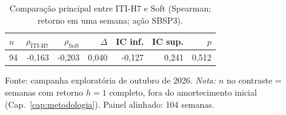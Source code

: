 \begin{table}[htbp]
\centering
\caption{Comparação principal entre ITI-H7 e Soft (Spearman; retorno em uma semana; ação SBSP3).}
\label{tab:iti-primary}
\begin{tabularx}{\textwidth}{@{}lrrrrrr@{}}
\toprule
$n$ & $\rho_{\mathrm{ITI\text{-}H7}}$ & $\rho_{\mathrm{Soft}}$ & $\Delta$ & IC inf. & IC sup. & $p$ \\
\midrule
94 & -0,163 & -0,203 & 0,040 & -0,127 & 0,241 & 0,512 \\
\bottomrule
\end{tabularx}
\vspace{0.4em}
{\footnotesize Fonte: campanha exploratória de outubro de 2026. \emph{Nota:} $n$ no contraste = semanas com retorno $h=1$ completo, fora do amortecimento inicial (Cap.~\ref{cap:metodologia}). Painel alinhado: 104 semanas.}
\end{table}
